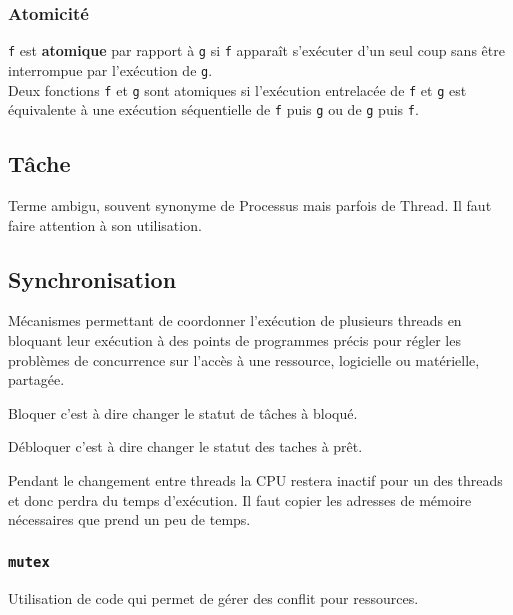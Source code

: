 \documentclass{article}
\begin{document}
\subsubsection{Atomicité}
\begin{definition}\label{def:atomicite}
    \texttt{f} est \textbf{atomique} par rapport à \texttt{g} si \texttt{f} apparaît s'exécuter d'un seul coup sans être interrompue par l'exécution de \texttt{g}.\\

    Deux fonctions \texttt{f} et \texttt{g} sont atomiques si l'exécution entrelacée de \texttt{f} et \texttt{g} est équivalente à une exécution séquentielle de \texttt{f} puis \texttt{g} ou de \texttt{g} puis \texttt{f}.
\end{definition}

\subsection{Tâche}
\begin{definition}\label{def:tache}
    Terme ambigu, souvent synonyme de Processus mais parfois de Thread. Il faut faire attention à son utilisation.
\end{definition}


\subsection{Synchronisation}
\begin{definition}\label{def:synchronisation}
    Mécanismes permettant de coordonner l'exécution de plusieurs threads en bloquant leur exécution à des points de programmes précis pour régler les problèmes de concurrence sur l'accès à une ressource, logicielle ou matérielle, partagée.

    \begin{remark}
        Bloquer c'est à dire changer le statut de tâches à bloqué.
    \end{remark}
    \begin{remark}
        Débloquer c'est à dire changer le statut des taches à prêt.
    \end{remark}

    Pendant le changement entre threads la CPU restera inactif pour un des threads et donc perdra du temps d'exécution. Il faut copier les adresses de mémoire nécessaires que prend un peu de temps.
\end{definition}

\subsubsection{\texttt{mutex}}
\begin{definition}\label{def:mutex}
    Utilisation de code qui permet de gérer des conflit pour ressources. 
\end{definition}
\end{document}
